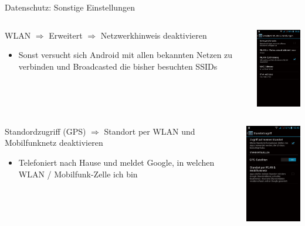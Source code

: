 \documentclass{beamer}
\begin{document}
\begin{frame}{Datenschutz: Sonstige Einstellungen}

\begin{columns}[c]
  \begin{column}[T]{.7\textwidth}
    WLAN $\Longrightarrow$ Erweitert $\Longrightarrow$ Netzwerkhinweis deaktivieren
    \begin{itemize}
      \item Sonst versucht sich Android mit allen bekannten Netzen zu verbinden und Broadcasted die bisher besuchten SSIDs
    \end{itemize}
  \end{column}
  \begin{column}[T]{.3\textwidth}
    \includegraphics[width=3.5cm]{wlan.png} 
   \end{column}
\end{columns}

        \pause

\begin{columns}[c]
  \begin{column}[T]{.7\textwidth}

    \vspace{-2cm}
    Standordzugriff (GPS) $\Longrightarrow$ Standort per WLAN und Mobilfunknetz deaktivieren
      \begin{itemize}
        \item Telefoniert nach Hause und meldet Google, in welchen WLAN / Mobilfunk-Zelle ich bin
      \end{itemize}
   \end{column}
  \begin{column}[T]{.3\textwidth}
    \vspace{-6.1cm}
    \includegraphics[width=3.5cm]{standort.png} 
   \end{column}
\end{columns}


\end{frame}
\end{document}
